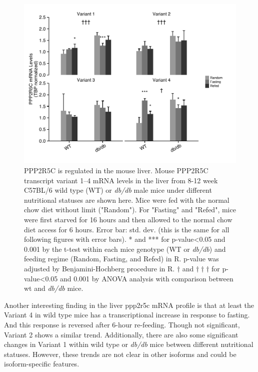 \begin{figure}[!tb]
\centering
\includegraphics[width=1\textwidth]{figs/fig2-1 liver ppp2r5c.pdf}
\caption[PPP2R5C expression in the liver]{\footnotesize PPP2R5C is regulated in the mouse liver. Mouse PPP2R5C transcript variant 1--4 mRNA levels in the liver from 8-12 week C57BL/6 wild type (WT) or \textit{db/db} male mice under different nutritional statuses are shown here. Mice were fed with the normal chow diet without limit ("Random"). For "Fasting" and "Refed", mice were first starved for 16 hours and then allowed to the normal chow diet access for 6 hours. Error bar: std. dev. (this is the same for all following figures with error bars). * and *** for p-value<0.05 and 0.001 by the t-test within each mice genotype (WT or \textit{db/db}) and feeding regime (Random, Fasting, and Refed) in R. p-value was adjusted by Benjamini-Hochberg procedure in R. $\dagger$ and $\dagger\dagger\dagger$ for p-value<0.05 and 0.001 by \gls{ANOVA} analysis with comparison between wt and \textit{db/db} mice.}
\label{fig:fig2.1}
\end{figure}

Another interesting finding in the liver \gls{ppp2r5c} mRNA profile is that at least the Variant 4 in wild type mice has a transcriptional increase in response to fasting. And this response is reversed after 6-hour re-feeding. Though not significant, Variant 2 shows a similar trend. Additionally, there are also some significant changes in Variant 1 within wild type or \textit{db/db} mice between different nutritional statuses. However, these trends are not clear in other isoforms and could be isoform-specific features.


